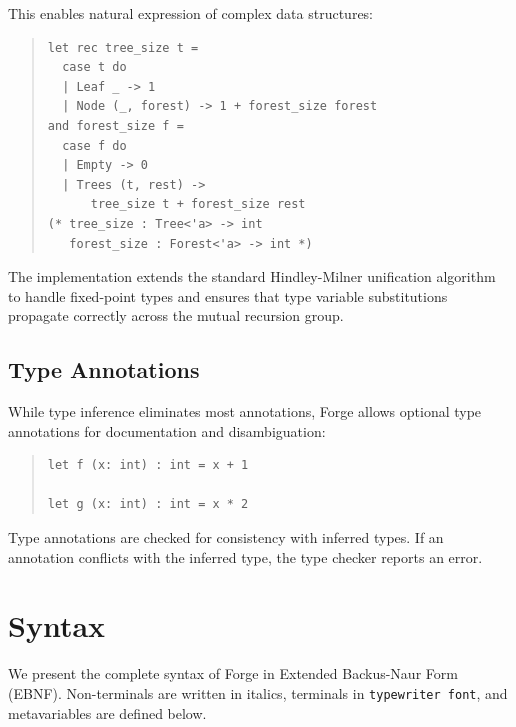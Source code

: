 \documentclass[conference,onecolumn]{IEEEtran}
\begin{document}
This enables natural expression of complex data structures:

\begin{quote}
\small
\begin{verbatim}
let rec tree_size t =
  case t do
  | Leaf _ -> 1
  | Node (_, forest) -> 1 + forest_size forest
and forest_size f =
  case f do
  | Empty -> 0
  | Trees (t, rest) -> 
      tree_size t + forest_size rest
(* tree_size : Tree<'a> -> int
   forest_size : Forest<'a> -> int *)
\end{verbatim}
\end{quote}

The implementation extends the standard Hindley-Milner unification algorithm to handle fixed-point types and ensures that type variable substitutions propagate correctly across the mutual recursion group.

\subsection{Type Annotations}

While type inference eliminates most annotations, Forge allows optional type annotations for documentation and disambiguation:

\begin{quote}
\small
\begin{verbatim}
let f (x: int) : int = x + 1

let g (x: int) : int = x * 2
\end{verbatim}
\end{quote}

Type annotations are checked for consistency with inferred types. If an annotation conflicts with the inferred type, the type checker reports an error.

\newpage
\section{Syntax}

We present the complete syntax of Forge in Extended Backus-Naur Form (EBNF). Non-terminals are written in italics, terminals in \texttt{typewriter font}, and metavariables are defined below.
\end{document}
